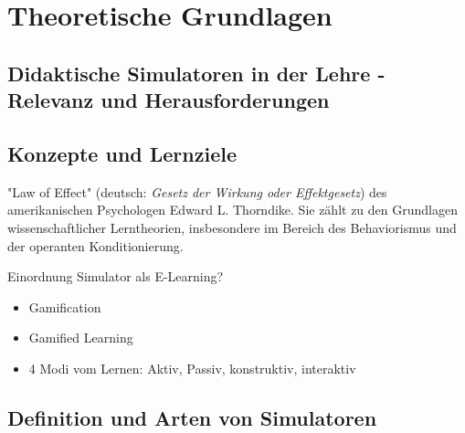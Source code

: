 \chapter{Theoretische Grundlagen}

\section{Didaktische Simulatoren in der Lehre - Relevanz und Herausforderungen}

\section{Konzepte und Lernziele}


"Law of Effect" (deutsch: \textit{Gesetz der Wirkung oder Effektgesetz}) des amerikanischen Psychologen Edward L. Thorndike. Sie zählt zu den Grundlagen wissenschaftlicher Lerntheorien, insbesondere im Bereich des Behaviorismus und der operanten Konditionierung.

Einordnung Simulator als E-Learning?

\begin{itemize}
    \item Gamification
    \item Gamified Learning
    \item 4 Modi vom Lernen: Aktiv, Passiv, konstruktiv, interaktiv
\end{itemize}

\section{Definition und Arten von Simulatoren}
